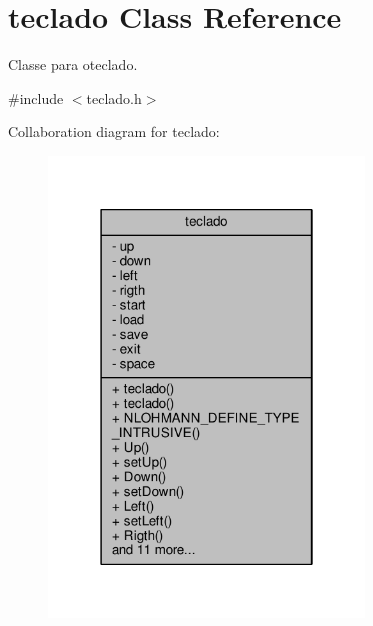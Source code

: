 \hypertarget{classteclado}{}\section{teclado Class Reference}
\label{classteclado}


Classe para oteclado.  




{\ttfamily \#include $<$teclado.\+h$>$}



Collaboration diagram for teclado\+:
\nopagebreak
\begin{figure}[H]
\begin{center}
\leavevmode
\includegraphics[width=238pt]{classteclado__coll__graph}
\end{center}
\end{figure}
